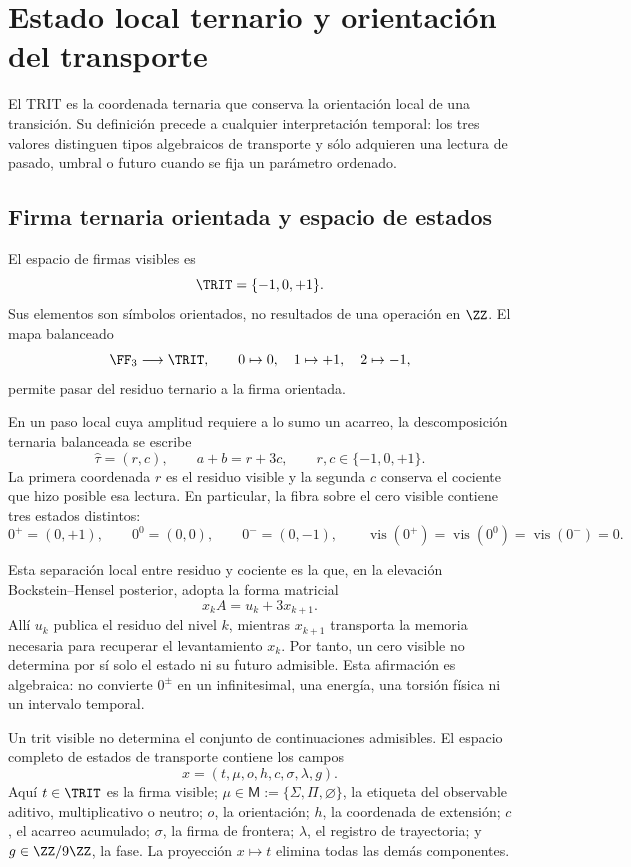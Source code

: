 \ifdefined\HMTTRITFormal
\chapter{Estado local ternario y orientación del transporte}
\label{chap:trit}

El TRIT es la coordenada ternaria que conserva la orientación local de una
transición. Su definición precede a cualquier interpretación temporal: los
tres valores distinguen tipos algebraicos de transporte y sólo adquieren una
lectura de pasado, umbral o futuro cuando se fija un parámetro ordenado.

\section{Firma ternaria orientada y espacio de estados}

El espacio de firmas visibles es
\[
\TRIT=\{-1,0,+1\}.
\]
Sus elementos son símbolos orientados, no resultados de una operación en
\(\ZZ\). El mapa balanceado
\[
\FF_3\longrightarrow\TRIT,
\qquad0\mapsto0,\quad1\mapsto+1,\quad2\mapsto-1,
\]
permite pasar del residuo ternario a la firma orientada.

\begin{definition}
\label{def:trit-levantado-carry-rev8}
En un paso local cuya amplitud requiere a lo sumo un acarreo, la
descomposición ternaria balanceada se escribe
\[
 \widehat\tau=(r,c),\qquad
 a+b=r+3c,
 \qquad r,c\in\{-1,0,+1\}.
\]
La primera coordenada \(r\) es el residuo visible y la segunda \(c\) conserva
el cociente que hizo posible esa lectura.  En particular, la fibra sobre el
cero visible contiene tres estados distintos:
\[
 0^+=(0,+1),\qquad 0^0=(0,0),\qquad 0^-=(0,-1),
 \qquad
 \operatorname{vis}(0^+)=\operatorname{vis}(0^0)
 =\operatorname{vis}(0^-)=0.
\]
\end{definition}

Esta separación local entre residuo y cociente es la que, en la elevación
Bockstein--Hensel posterior, adopta la forma matricial
\[
 x_k A=u_k+3x_{k+1}.
\]
Allí \(u_k\) publica el residuo del nivel \(k\), mientras \(x_{k+1}\)
transporta la memoria necesaria para recuperar el levantamiento \(x_k\).  Por tanto,
un cero visible no determina por sí solo el estado ni su futuro admisible.
Esta afirmación es algebraica: no convierte \(0^\pm\) en un infinitesimal,
una energía, una torsión física ni un intervalo temporal.

Un trit visible no determina el conjunto de continuaciones admisibles. El
espacio completo de estados de transporte contiene los campos
\[
x=(t,\mu,o,h,c,\sigma,\lambda,g).
\]
Aquí \(t\in\TRIT\) es la firma visible;
\(\mu\in\mathsf M:=\{\Sigma,\Pi,\varnothing\}\), la etiqueta del observable
aditivo, multiplicativo o neutro; \(o\), la orientación; \(h\), la coordenada de extensión;
\(c\), el acarreo acumulado; \(\sigma\), la firma de frontera; \(\lambda\), el
registro de trayectoria; y
\(g\in\ZZ/9\ZZ\), la fase. La proyección \(x\mapsto t\) elimina todas las
demás componentes.

